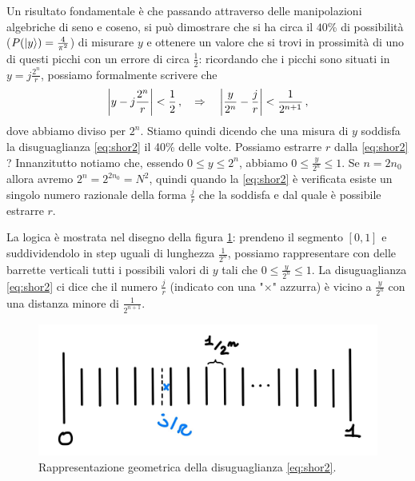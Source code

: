 \noindent Un risultato fondamentale è che passando attraverso delle manipolazioni algebriche di seno e coseno, si può dimostrare che si ha circa il $40$\% di possibilità ($P(\ket{y}) = \frac{4}{\pi^2}$) di misurare $y$ e ottenere un valore che si trovi in prossimità di uno di questi picchi con un errore di circa $\frac 12$: ricordando che i picchi sono situati in $y = j \frac{2^n}{r}$, possiamo formalmente scrivere che
\begin{equation}
    \abs{y-j\frac{2^n}{r}} < \frac 12 \, , \quad \Rightarrow \quad 
    \abs{\frac y{2^n}-\frac jr} < \frac 1{2^{n+1}} \, ,
    \label{eq:shor2}
\end{equation}
dove abbiamo diviso per $2^n$. Stiamo quindi dicendo che una misura di $y$ soddisfa la disuguaglianza \eqref{eq:shor2} il 40\% delle volte. Possiamo estrarre $r$ dalla \eqref{eq:shor2} ? Innanzitutto notiamo che, essendo $0 \leqslant y \leqslant 2^n$, abbiamo $0 \leqslant \frac{y}{2^n} \leqslant 1$. Se $n = 2 n_0$ allora avremo $2^{n}=2^{2n_0}=N^2$, quindi quando la \eqref{eq:shor2} è verificata esiste un singolo numero razionale della forma $\frac j r$ che la  soddisfa e dal quale è possibile estrarre $r$. 

\noindent La logica è mostrata nel disegno della figura \ref{fig:inequality_40}: prendeno il segmento $[0,1]$ e suddividendolo in step uguali di lunghezza $\frac{1}{2^n}$, possiamo rappresentare con delle barrette verticali tutti i possibili valori di $y$ tali che $0 \leqslant \frac{y}{2^n} \leqslant 1$. La disuguaglianza \eqref{eq:shor2} ci dice che il numero $\frac{j}{r}$ (indicato con una "$\times$" azzurra) è vicino a $\frac{y}{2^n}$ con una distanza minore di $\frac{1}{2^{n+1}}$. 
\begin{figure}[!h]
    \centering
    \includegraphics[scale=0.3]{images/inequality_40}
    \caption{Rappresentazione geometrica della disuguaglianza \eqref{eq:shor2}.}
    \label{fig:inequality_40}
\end{figure}

